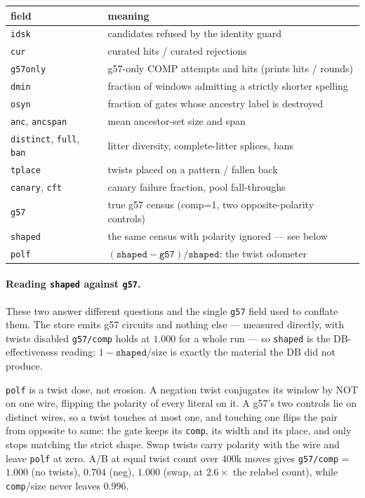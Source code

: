 \documentclass[11pt]{article}
\begin{document}
\begin{center}
\begin{tabular}{ll}
\toprule
field & meaning \\
\midrule
\texttt{idsk} & candidates refused by the identity guard \\
\texttt{cur} & curated hits / curated rejections \\
\texttt{g57only} & g57-only COMP attempts and hits (prints hits / rounds) \\
\texttt{dmin} & fraction of windows admitting a strictly shorter spelling \\
\texttt{osyn} & fraction of gates whose ancestry label is destroyed \\
\texttt{anc}, \texttt{ancspan} & mean ancestor-set size and span \\
\texttt{distinct}, \texttt{full}, \texttt{ban} & litter diversity, complete-litter splices, bans \\
\texttt{tplace} & twists placed on a pattern / fallen back \\
\texttt{canary}, \texttt{cft} & canary failure fraction, pool fall-throughs \\
\texttt{g57} & true g57 census (comp=1, two opposite-polarity controls) \\
\texttt{shaped} & the same census with polarity ignored --- see below \\
\texttt{polf} & $(\texttt{shaped}-\texttt{g57})/\texttt{shaped}$: the twist odometer \\
\bottomrule
\end{tabular}
\end{center}

\paragraph{Reading \texttt{shaped} against \texttt{g57}.} These two answer
different questions and the single \texttt{g57} field used to conflate them.
The store emits g57 circuits and nothing else --- measured directly, with
twists disabled \texttt{g57/comp} holds at $1.000$ for a whole run --- so
\texttt{shaped} is the DB-effectiveness reading: $1-\texttt{shaped}/\text{size}$
is exactly the material the DB did not produce.

\texttt{polf} is a twist dose, not erosion. A negation twist conjugates its
window by NOT on one wire, flipping the polarity of every literal on it. A
g57's two controls lie on distinct wires, so a twist touches at most one, and
touching one flips the pair from opposite to same: the gate keeps its
\texttt{comp}, its width and its place, and only stops matching the strict
shape. Swap twists carry polarity with the wire and leave \texttt{polf} at
zero. A/B at equal twist count over 400k moves gives \texttt{g57/comp} =
$1.000$ (no twists), $0.704$ (neg), $1.000$ (swap, at $2.6\times$ the relabel
count), while \texttt{comp}/size never leaves $0.996$.
\end{document}
